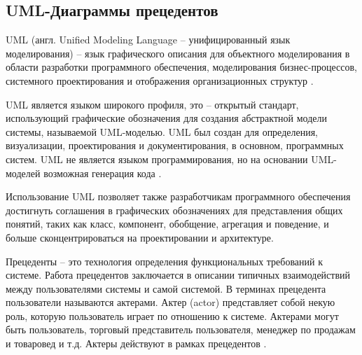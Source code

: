 \subsection{UML-Диаграммы прецедентов}

UML (англ. Unified Modeling Language – унифицированный язык моделирования) – язык графического описания для объектного моделирования в области разработки программного обеспечения, моделирования бизнес-процессов, системного проектирования и отображения организационных структур \cite{uml}. 

UML является языком широкого профиля, это – открытый стандарт, использующий графические обозначения для создания абстрактной модели системы, называемой UML-моделью. UML был создан для определения, визуализации, проектирования и документирования, в основном, программных систем. UML не является языком программирования, но на основании UML-моделей возможная генерация кода \cite{uml}. 

Использование UML позволяет также разработчикам программного обеспечения достигнуть соглашения в графических обозначениях для представления общих понятий, таких как класс, компонент, обобщение, агрегация и поведение, и больше сконцентрироваться на проектировании и архитектуре. 

Прецеденты – это технология определения функциональных требований к системе. Работа прецедентов заключается в описании типичных взаимодействий между пользователями системы и самой системой. В терминах прецедента пользователи называются актерами. Актер (actor) представляет собой некую роль, которую пользователь играет по отношению к системе. Актерами могут быть пользователь, торговый представитель пользователя, менеджер по продажам и товаровед и т.д. Актеры действуют в рамках прецедентов \cite{uml}.





